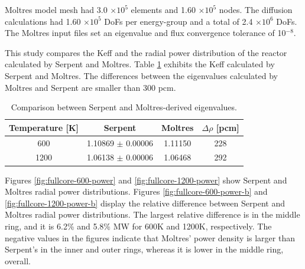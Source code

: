 Moltres model mesh had 3.0 $\times 10^5$ elements and 1.60 $\times 10^5$ nodes.
The diffusion calculations had 1.60 $\times 10^5$ \glspl{DoF} per energy-group and a total of 2.4 $\times 10^6$ DoFs.
The Moltres input files set an eigenvalue and flux convergence tolerance of 10$^{-8}$.

This study compares the \gls{Keff} and the radial power distribution of the reactor calculated by Serpent and Moltres.
Table \ref{tab:full-keff} exhibits the \gls{Keff} calculated by Serpent and Moltres.
The differences between the eigenvalues calculated by Moltres and Serpent are smaller than 300 pcm.

\begin{table}[htbp!]
  \centering
  \caption{Comparison between Serpent and Moltres-derived eigenvalues.}
  \begin{tabular}{cccc}
  \toprule
  Temperature [K] & Serpent	& Moltres  & $\Delta \rho$ [pcm] 	\\
  \midrule
			 600  	    & 1.10869 $\pm$ 0.00006  & 1.11150	 &	228		\\
			1200 	      & 1.06138 $\pm$ 0.00006  & 1.06468	 &	292   \\
  \bottomrule
  \end{tabular}
  \label{tab:full-keff}
\end{table}

Figures \ref{fig:fullcore-600-power} and \ref{fig:fullcore-1200-power} show Serpent and Moltres radial power distributions.
Figures \ref{fig:fullcore-600-power-b} and \ref{fig:fullcore-1200-power-b} display the relative difference between Serpent and Moltres radial power distributions.
The largest relative difference is in the middle ring, and it is 6.2\% and 5.8\% MW for 600K and 1200K, respectively.
The negative values in the figures indicate that Moltres' power density is larger than Serpent's in the inner and outer rings, whereas it is lower in the middle ring, overall.

